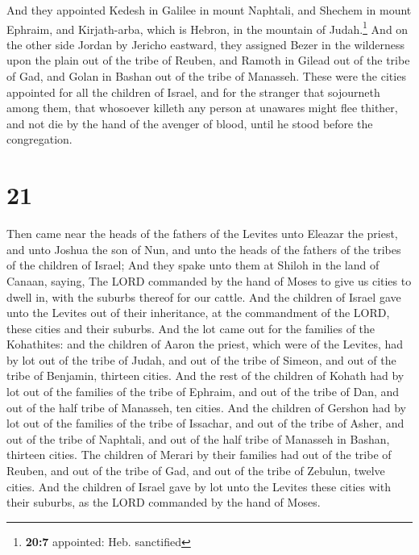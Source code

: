  And they appointed Kedesh in Galilee in mount Naphtali,
and Shechem in mount Ephraim, and Kirjath-arba, which is Hebron, in the
mountain of Judah.\footnote{\textbf{20:7} appointed: Heb. sanctified}
 And on the other side Jordan by Jericho eastward, they
assigned Bezer in the wilderness upon the plain out of the tribe of
Reuben, and Ramoth in Gilead out of the tribe of Gad, and Golan in
Bashan out of the tribe of Manasseh.  These were the
cities appointed for all the children of Israel, and for the stranger
that sojourneth among them, that whosoever killeth any person at
unawares might flee thither, and not die by the hand of the avenger of
blood, until he stood before the congregation.

\hypertarget{section-20}{%
\section{21}\label{section-20}}

 Then came near the heads of the fathers of the Levites
unto Eleazar the priest, and unto Joshua the son of Nun, and unto the
heads of the fathers of the tribes of the children of Israel;
 And they spake unto them at Shiloh in the land of Canaan,
saying, The LORD commanded by the hand of Moses to give us cities to
dwell in, with the suburbs thereof for our cattle.  And
the children of Israel gave unto the Levites out of their inheritance,
at the commandment of the LORD, these cities and their suburbs.
 And the lot came out for the families of the Kohathites:
and the children of Aaron the priest, which were of the Levites, had by
lot out of the tribe of Judah, and out of the tribe of Simeon, and out
of the tribe of Benjamin, thirteen cities.  And the rest
of the children of Kohath had by lot out of the families of the tribe of
Ephraim, and out of the tribe of Dan, and out of the half tribe of
Manasseh, ten cities.  And the children of Gershon had by
lot out of the families of the tribe of Issachar, and out of the tribe
of Asher, and out of the tribe of Naphtali, and out of the half tribe of
Manasseh in Bashan, thirteen cities.  The children of
Merari by their families had out of the tribe of Reuben, and out of the
tribe of Gad, and out of the tribe of Zebulun, twelve cities.
 And the children of Israel gave by lot unto the Levites
these cities with their suburbs, as the LORD commanded by the hand of
Moses.

